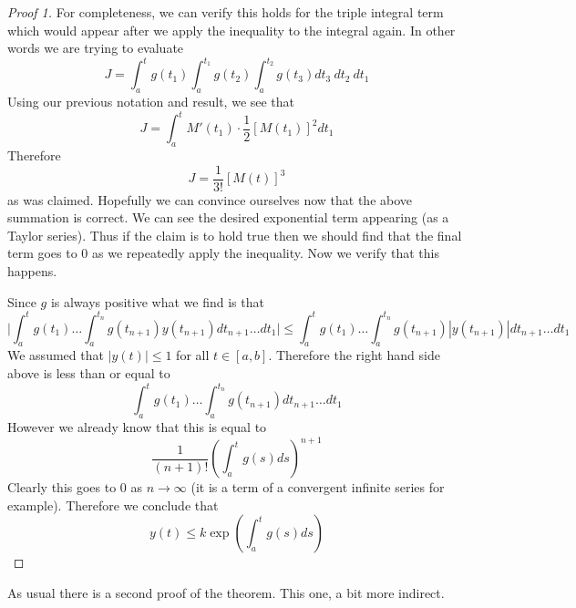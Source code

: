 \begin{proof}[Proof 1]
    For completeness, we can verify this holds for the triple integral term which would appear after we apply the inequality to the integral again. In other words we are trying to evaluate
    $$ J = \int_a^t g(t_1) \int_a^{t_1} g(t_2) \int_a^{t_2} g(t_3) dt_3 \ dt_2 \ dt_1 $$
    Using our previous notation and result, we see that
    $$ J = \int_a^t M'(t_1) \cdot \frac{1}{2} [M(t_1)]^2 dt_1 $$
    Therefore
    $$ J = \frac{1}{3!} [M(t)]^3 $$
    as was claimed. Hopefully we can convince ourselves now that the above summation is correct. We can see the desired exponential term appearing (as a Taylor series). Thus if the claim is to hold true then we should find that the final term goes to 0 as we repeatedly apply the inequality. Now we verify that this happens.
    
    Since $g$ is always positive what we find is that
    $$ \bigg| \int_a^t g(t_1) \dots \int_a^{t_n} g(t_{n+1}) y(t_{n + 1}) dt_{n+1}\dots dt_1 \bigg| \leq \int_a^t g(t_1) \dots \int_a^{t_n} g(t_{n+1}) \left|y(t_{n + 1})\right| dt_{n+1}\dots dt_1 $$
    We assumed that $|y(t)| \leq 1$ for all $t \in [a, b]$. Therefore the right hand side above is less than or equal to
    $$\int_a^t g(t_1) \dots \int_a^{t_n} g(t_{n+1}) dt_{n+1}\dots dt_1 $$
    However we already know that this is equal to
    $$ \frac{1}{(n + 1)!} \left( \int_a^t g(s)ds \right)^{n+1} $$
    Clearly this goes to 0 as $n \to \infty$ (it is a term of a convergent infinite series for example). Therefore we conclude that 
    $$y(t) \leq k \exp \left( \int_a^t g(s) ds \right)$$
\end{proof}
As usual there is a second proof of the theorem. This one, a bit more indirect.
